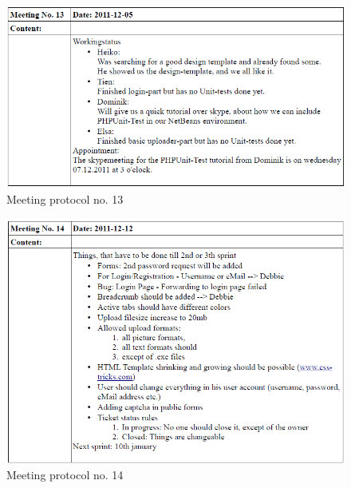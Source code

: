 \begin{appendix}
\begin{figure}
  \centering
    \includegraphics[width=\textwidth]{images/a_meetings/meeting_13.png}
  \caption{Meeting protocol no. 13}
  \label{fig:meeting protocol no. 13}
\end{figure}
\clearpage
\begin{figure}
  \centering
    \includegraphics[width=\textwidth]{images/a_meetings/meeting_14.png}
  \caption{Meeting protocol no. 14}
  \label{fig:meeting protocol no. 14}
\end{figure}


\end{appendix}
